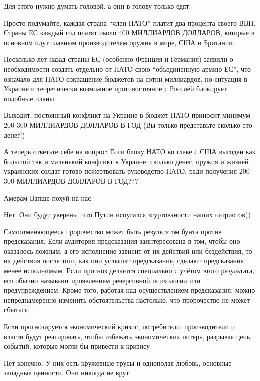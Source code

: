 \begin{multicols}{2}

Для этого нужно думать  головой, а они в голову только едят.


Просто подумайте, каждая страна \enquote{член НАТО} платит два процента своего ВВП.
Страны ЕС каждый год платят около 400 МИЛЛИАРДОВ ДОЛЛАРОВ, которые в основном
идут главным производителям оружия в мире, США и Британии.
 
Несколько лет назад страны ЕС (особенно Франция и Германия) заявили о
необходимости создать отдельно от НАТО свою \enquote{объединенную армию ЕС}, что
означало для НАТО сокращение бюджетов на сотни миллиардов, но ситуация в
Украине и теоретически возможное противостояние с Россией блокирует подобные
планы.
 
Выходит, постоянный конфликт на Украине в бюджет НАТО приносит минимум 200-300
МИЛЛИАРДОВ ДОЛЛАРОВ В ГОД (Вы только представьте сколько это денег!)
 
А теперь ответьте себе на вопрос: Если блоку НАТО во главе с США выгоден как
большой так и маленький конфликт в Украине, сколько денег, оружия и жизней
украинских солдат готово пожертвовать руководство НАТО, ради получения 200-300
МИЛЛИАРДОВ ДОЛЛАРОВ В ГОД???


Амерам Вапще похуй на нас


Нет. Они будут уверены, что Путин испугался згуртованости наших патриотов))


Самоотменяющееся пророчество может быть результатом бунта против предсказания.
Если аудитория предсказания заинтересована в том, чтобы оно оказалось ложным, а
его исполнение зависит от их действий или бездействия, то их действия после
того, как они услышат предсказание, сделают предсказание менее исполнимым. Если
прогноз делается специально с учётом этого результата, его обычно называют
проявлением реверсивной психологии или предупреждением. Кроме того, работая над
осуществлением предсказания, можно непреднамеренно изменить обстоятельства
настолько, что пророчество не может сбыться.

Если прогнозируется экономический кризис, потребители, производители и власти
будут реагировать, чтобы избежать экономических потерь, разрывая цепь событий,
которые могли бы привести к кризису


Нет конечно. У них есть кружевные трусы и однополая любовь, основные западные
ценности. Они никогда не врут.

\end{multicols} %
